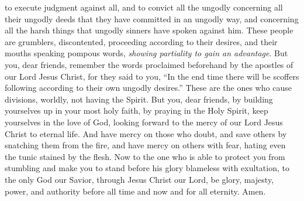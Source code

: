 \begin{biblechapter}
\verse to execute judgment against all, and to convict all the ungodly concerning all their ungodly deeds that they have committed in an ungodly way, and concerning all the harsh things that ungodly sinners have spoken against him.
\verse These people are grumblers, discontented, proceeding according to their desires, and their mouths speaking pompous words, \textit{showing partiality to gain an advantage}.
 But you, dear friends, remember the words proclaimed beforehand by the apostles of our Lord Jesus Christ,
\verse for they said to you, “In the end time there will be scoffers following according to their own ungodly desires.”
\verse These are the ones who cause divisions, worldly, not having the Spirit.
\verse But you, dear friends, by building yourselves up in your most holy faith, by praying in the Holy Spirit,
\verse keep yourselves in the love of God, looking forward to the mercy of our Lord Jesus Christ to eternal life.
\verse And have mercy on those who doubt,
\verse and save others by snatching them from the fire, and have mercy on others with fear, hating even the tunic stained by the flesh.
 Now to the one who is able to protect you from stumbling and make you to stand before his glory blameless with exultation,
\verse to the only God our Savior, through Jesus Christ our Lord, be glory, majesty, power, and authority before all time and now and for all eternity. Amen.
\end{biblechapter}

